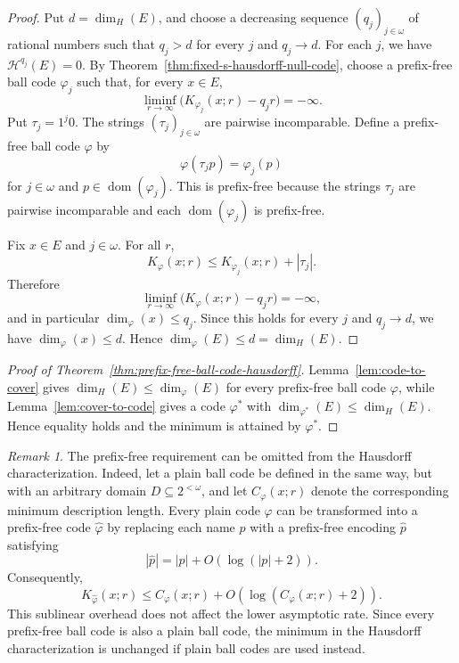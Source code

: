 \documentclass[a4paper,oneside,reqno,12pt]{amsart}
\theoremstyle{plain}
\theoremstyle{definition}
\theoremstyle{remark}
\newtheorem{remark}[theorem]{Remark}
\DeclareMathOperator{\dom}{dom}
\begin{document}
\begin{proof}
Put \(d=\dim_H(E)\), and choose a decreasing sequence
\((q_j)_{j\in\omega}\) of rational numbers such that \(q_j>d\) for every \(j\)
and \(q_j\to d\).  For each \(j\), we have \(\mathcal H^{q_j}(E)=0\).
By Theorem~\ref{thm:fixed-s-hausdorff-null-code}, choose a prefix-free ball code
\(\varphi_j\) such that, for every \(x\in E\),
\[
\liminf_{r\to\infty}\bigl(K_{\varphi_j}(x;r)-q_jr\bigr)=-\infty.
\]
Put \(\tau_j=1^j0\).  The strings \((\tau_j)_{j\in\omega}\) are pairwise
incomparable.
Define a prefix-free ball code \(\varphi\) by
\[
\varphi(\tau_jp)=\varphi_j(p)
\]
for \(j\in\omega\) and \(p\in\dom(\varphi_j)\).
This is prefix-free because the strings \(\tau_j\) are pairwise incomparable
and each \(\dom(\varphi_j)\) is prefix-free.

Fix \(x\in E\) and \(j\in\omega\).  For all \(r\),
\[
K_\varphi(x;r)\le K_{\varphi_j}(x;r)+|\tau_j|.
\]
Therefore
\[
\liminf_{r\to\infty}\bigl(K_\varphi(x;r)-q_jr\bigr)=-\infty,
\]
and in particular \(\dim_\varphi(x)\le q_j\).  Since this holds for every
\(j\) and \(q_j\to d\), we have \(\dim_\varphi(x)\le d\).  Hence
\(\dim_\varphi(E)\le d=\dim_H(E)\).
\end{proof}


\begin{proof}[Proof of Theorem~\ref{thm:prefix-free-ball-code-hausdorff}]
Lemma~\ref{lem:code-to-cover} gives
\(\dim_H(E)\le\dim_\varphi(E)\) for every prefix-free ball code \(\varphi\),
while Lemma~\ref{lem:cover-to-code} gives a code \(\varphi^*\) with
\(\dim_{\varphi^*}(E)\le\dim_H(E)\).  Hence equality holds and the minimum is
attained by \(\varphi^*\).
\end{proof}

\begin{remark}
The prefix-free requirement can be omitted from the Hausdorff characterization.
Indeed, let a plain ball code be defined in the same way,
but with an arbitrary domain \(D\subseteq 2^{<\omega}\), and let
\(C_\varphi(x;r)\) denote the corresponding minimum description length.
Every plain code \(\varphi\) can be transformed into a prefix-free code
\(\widehat\varphi\) by replacing each name \(p\) with a prefix-free
encoding \(\widehat p\) satisfying
\[
  |\widehat p|=|p|+O(\log(|p|+2)).
\]
Consequently,
\[
  K_{\widehat\varphi}(x;r)
  \le C_\varphi(x;r)
     +O(\log(C_\varphi(x;r)+2)).
\]
This sublinear overhead does not affect the lower asymptotic rate.
Since every prefix-free ball code is also a plain ball code,
the minimum in the Hausdorff characterization is unchanged if plain ball codes
are used instead.
\end{remark}
\end{document}
